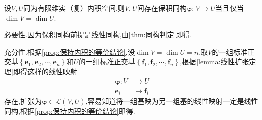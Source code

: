 \begin{green}
    \begin{corollary}[内积空间保积同构的等价条件]\label{coro:内积空间保积同构的等价条件}
        设$V,U$同为有限维实（复）内积空间,则$V,U$间存在保积同构$\bm{\varphi}:V\longrightarrow U$当且仅当$\dim V=\dim U$.
    \end{corollary}
    \begin{Proof}
        必要性.因为保积同构前提是线性同构,由\cref{thm:同构判定}即得.

        充分性.根据\cref{prop:保持内积的等价结论},设$\dim V=\dim U=n$,取$V$的一组标准正交基$\left\{
            \bm{e}_1,\bm{e}_2,\cdots,\bm{e}_n
            \right\}$和$U$的一组标准正交基$\left\{
                \bm{f}_1,\bm{f}_2,\cdots,\bm{f}_n
                \right\}$,根据\cref{lemma:线性扩张定理}即得这样的线性映射\begin{align*}
                    \bm{\varphi}:V&\longrightarrow U\\
                    \bm{e}_i&\longmapsto\bm{f}_i
                \end{align*}存在,扩张为$\bm{\varphi}\in\mathcal{L}\left(V,U\right)$,容易知道将一组基映为另一组基的线性映射一定是线性同构,根据\cref{prop:保持内积的等价结论}即得.\qedhere
    \end{Proof}
\end{green}
